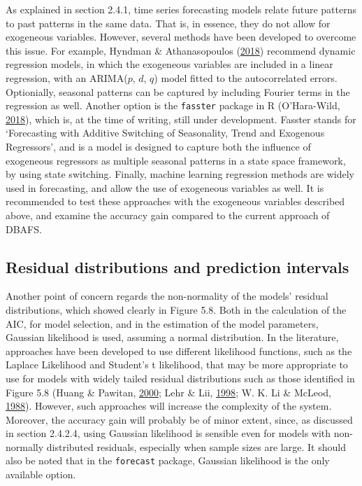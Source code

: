 \documentclass[12pt,oneside]{reedthesis}
\begin{document}
As explained in section 2.4.1, time series forecasting models relate
future patterns to past patterns in the same data. That is, in essence,
they do not allow for exogeneous variables. However, several methods
have been developed to overcome this issue. For example, Hyndman \&
Athanasopoulos (\protect\hyperlink{ref-hyndman2018fpp}{2018}) recommend
dynamic regression models, in which the exogeneous variables are
included in a linear regression, with an ARIMA(\(p\), \(d\), \(q\))
model fitted to the autocorrelated errors. Optionially, seasonal
patterns can be captured by including Fourier terms in the regression as
well. Another option is the \texttt{fasster} package in R (O'Hara-Wild,
\protect\hyperlink{ref-fasster}{2018}), which is, at the time of
writing, still under development. Fasster stands for `Forecasting with
Additive Switching of Seasonality, Trend and Exogenous Regressors', and
is a model is designed to capture both the influence of exogeneous
regressors as multiple seasonal patterns in a state space framework, by
using state switching. Finally, machine learning regression methods are
widely used in forecasting, and allow the use of exogeneous variables as
well. It is recommended to test these approaches with the exogeneous
variables described above, and examine the accuracy gain compared to the
current approach of DBAFS.

\subsection{Residual distributions and prediction
intervals}\label{residual-distributions-and-prediction-intervals}

Another point of concern regards the non-normality of the models'
residual distributions, which showed clearly in Figure 5.8. Both in the
calculation of the AIC, for model selection, and in the estimation of
the model parameters, Gaussian likelihood is used, assuming a normal
distribution. In the literature, approaches have been developed to use
different likelihood functions, such as the Laplace Likelihood and
Student's t likelihood, that may be more appropriate to use for models
with widely tailed residual distributions such as those identified in
Figure 5.8 (Huang \& Pawitan, \protect\hyperlink{ref-huang2000}{2000};
Lehr \& Lii, \protect\hyperlink{ref-lehr1998}{1998}; W. K. Li \& McLeod,
\protect\hyperlink{ref-li1988}{1988}). However, such approaches will
increase the complexity of the system. Moreover, the accuracy gain will
probably be of minor extent, since, as discussed in section 2.4.2.4,
using Gaussian likelihood is sensible even for models with non-normally
distributed residuals, especially when sample sizes are large. It should
also be noted that in the \texttt{forecast} package, Gaussian likelihood
is the only available option.
\end{document}
